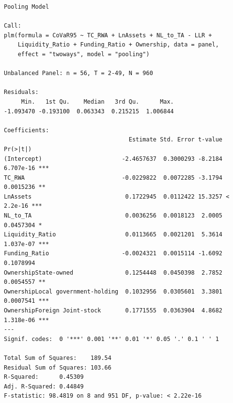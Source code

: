 \documentclass[
  letterpaper,
  DIV=11,
  numbers=noendperiod]{scrreprt}
\begin{document}
\begin{verbatim}
Pooling Model

Call:
plm(formula = CoVaR95 ~ TC_RWA + LnAssets + NL_to_TA - LLR + 
    Liquidity_Ratio + Funding_Ratio + Ownership, data = panel, 
    effect = "twoways", model = "pooling")

Unbalanced Panel: n = 56, T = 2-49, N = 960

Residuals:
     Min.   1st Qu.    Median   3rd Qu.      Max. 
-1.093470 -0.193100  0.063343  0.215215  1.006844 

Coefficients:
                                    Estimate Std. Error t-value  Pr(>|t|)    
(Intercept)                       -2.4657637  0.3000293 -8.2184 6.707e-16 ***
TC_RWA                            -0.0229822  0.0072285 -3.1794 0.0015236 ** 
LnAssets                           0.1722945  0.0112422 15.3257 < 2.2e-16 ***
NL_to_TA                           0.0036256  0.0018123  2.0005 0.0457304 *  
Liquidity_Ratio                    0.0113665  0.0021201  5.3614 1.037e-07 ***
Funding_Ratio                     -0.0024321  0.0015114 -1.6092 0.1078994    
OwnershipState-owned               0.1254448  0.0450398  2.7852 0.0054557 ** 
OwnershipLocal government-holding  0.1032956  0.0305601  3.3801 0.0007541 ***
OwnershipForeign Joint-stock       0.1771555  0.0363904  4.8682 1.318e-06 ***
---
Signif. codes:  0 '***' 0.001 '**' 0.01 '*' 0.05 '.' 0.1 ' ' 1

Total Sum of Squares:    189.54
Residual Sum of Squares: 103.66
R-Squared:      0.45309
Adj. R-Squared: 0.44849
F-statistic: 98.4819 on 8 and 951 DF, p-value: < 2.22e-16
\end{verbatim}
\end{document}
